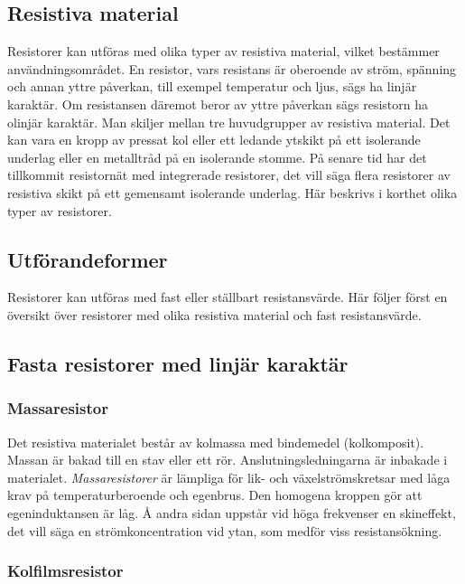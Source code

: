 \subsection{Resistiva material}

Resistorer kan utföras med olika typer av resistiva material, vilket bestämmer
användningsområdet.
En resistor, vars resistans är oberoende av ström, spänning och annan yttre
påverkan, till exempel temperatur och ljus, sägs ha linjär karaktär.
Om resistansen däremot beror av yttre påverkan sägs resistorn ha olinjär
karaktär.
Man skiljer mellan tre huvudgrupper av resistiva material.
Det kan vara en kropp av pressat kol eller ett ledande ytskikt på ett isolerande
underlag eller en metalltråd på en isolerande stomme.
På senare tid har det tillkommit resistornät med integrerade resistorer, det
vill säga flera resistorer av resistiva skikt på ett gemensamt isolerande
underlag.
Här beskrivs i korthet olika typer av resistorer.

\subsection{Utförandeformer}

Resistorer kan utföras med fast eller ställbart resistansvärde.
Här följer först en översikt över resistorer med olika resistiva material och
fast resistansvärde.

\subsection{Fasta resistorer med linjär karaktär}
\label{fasta_resistorer_linjära}

\subsubsection{Massaresistor}

Det resistiva materialet består av kolmassa med bindemedel (kolkomposit).
Massan är bakad till en stav eller ett rör.
Anslutningsledningarna är inbakade i materialet.
\emph{Massaresistorer} är lämpliga för lik- och växelströmskretsar med
låga krav på temperaturberoende och egenbrus.
Den homogena kroppen gör att egeninduktansen är låg.
Å andra sidan uppstår vid höga frekvenser en skineffekt, det vill säga en
strömkoncentration vid ytan, som medför viss resistansökning.

\subsubsection{Kolfilmsresistor}

